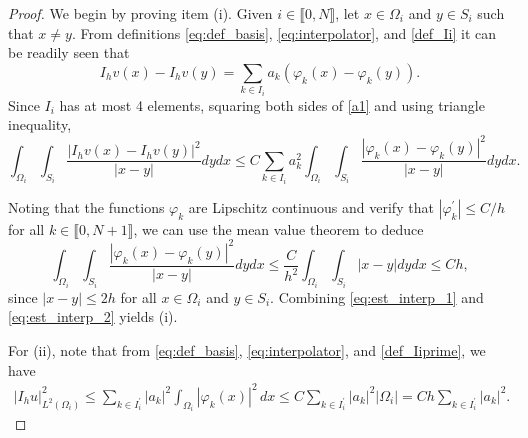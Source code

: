 \documentclass[11 pt]{article}
\newcommand\inter[1]{\llbracket #1\rrbracket}
\numberwithin{equation}{section}
\begin{document}
\begin{proof}
We begin by proving item (i). Given $i\in\inter{0,N}$, let $x\in \Omega_i$ and $y\in S_i$ such that $x\neq y$.  From definitions \eqref{eq:def_basis}, \eqref{eq:interpolator}, and \eqref{def_Ii} it can be readily seen that
%
\begin{equation}\label{a1}
    I_hv(x)-I_hv(y)=\sum_{k\in I_i} a_k(\varphi_k(x)-\varphi_k(y)).
\end{equation}
%
Since $I_i$ has at most 4 elements, squaring both sides of \eqref{a1} and using triangle inequality,
%
\begin{equation}\label{eq:est_interp_1}
    \int_{\Omega_i}\int_{S_i}\frac{|I_hv(x)- I_hv(y)|^2}{|x-y|} dy dx \leq C \sum_{k\in I_i} a_k^2\int_{\Omega_i}\int_{S_i} \frac{|\varphi_k(x)- \varphi_k(y)|^2}{|x-y|} dy dx.
\end{equation}
%

Noting that the functions $\varphi_k$ are Lipschitz continuous and verify that $|\varphi_k^\prime|\leq C/h$ for all $k\in\inter{0,N+1}$, we can use the mean value theorem to deduce
%
\begin{equation}\label{eq:est_interp_2}
    \int_{\Omega_i}\int_{S_i}\frac{|\varphi_k(x)-\varphi_k(y)|^2}{|x-y|}dy dx \leq \frac{C}{h^2}\int_{\Omega_i}\int_{S_i}|x-y|dy dx \leq Ch,
\end{equation}
%
since $|x-y|\leq 2h$ for all $x\in \Omega_i$ and $y\in S_i$. Combining \eqref{eq:est_interp_1} and \eqref{eq:est_interp_2} yields (i). 

For (ii), note that from \eqref{eq:def_basis}, \eqref{eq:interpolator}, and \eqref{def_Iiprime}, we have
\begin{align*}
|I_h u|^2_{L^2(\Omega_i)}
\leq \sum_{k\in I_i^\prime}|a_k|^2\int_{\Omega_i}|\varphi_k(x)|^2\, dx
\leq C\sum_{k\in I_i^\prime}|a_k|^2|\Omega_i|
=Ch\sum_{k\in I_i^\prime}|a_k|^2.
\end{align*}
%
\end{proof}
\end{document}
